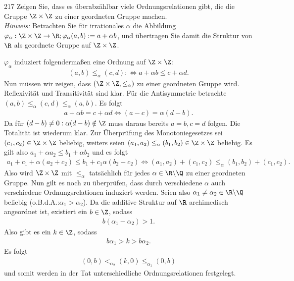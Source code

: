 \begin{algebraUE}{217}
Zeigen Sie, dass es überabzählbar viele Ordnungsrelationen gibt, die die Gruppe
$\Z \times \Z$ zu einer geordneten Gruppe machen. \\
\textit{Hinweis:} Betrachten Sie für irrationales $\alpha$ die Abbildung
$\varphi_{\alpha}: \Z \times \Z \to \R; \varphi_{\alpha}(a,b) := a + \alpha b$,
und übertragen Sie damit die Struktur von $\R$ als geordnete Gruppe auf $\Z \times \Z$.
\end{algebraUE}
\begin{solution}
$\varphi_{\alpha}$ induziert folgendermaßen eine Ordnung auf $\Z \times \Z$:
\begin{align*}
  (a,b) \leq_{\alpha} (c,d) :\iff a + \alpha b \leq c + \alpha d.
\end{align*}
Nun müssen wir zeigen, dass $(\Z \times \Z, \leq_{\alpha})$ zu einer geordneten Gruppe wird.
Reflexivität und Transitivität sind klar.
Für die Antisymmetrie betrachte $(a,b) \leq_{\alpha} (c,d) \leq_{\alpha} (a,b)$. Es folgt
\begin{align*}
  a + \alpha b= c + \alpha d \iff (a-c) = \alpha (d-b).
\end{align*}
Da für $(d-b)\neq 0: \alpha (d-b) \notin \Z$ muss daraus bereits $a=b, c=d$ folgen.
Die Totalität ist wiederum klar.
Zur Überprüfung des Monotoniegesetzes sei $(c_1,c_2) \in \Z \times \Z$ beliebig,
weiters seien $(a_1,a_2) \leq_{\alpha} (b_1,b_2) \in \Z \times \Z$ beliebig.
Es gilt also $a_1 + \alpha a_2 \leq b_1 + \alpha b_2$ und es folgt
\begin{align*}
  a_1 + c_1 + \alpha (a_2 + c_2) \leq b_1 + c_1 \alpha (b_2 + c_2) \iff
  (a_1,a_2) + (c_1,c_2) \leq_{\alpha} (b_1,b_2) + (c_1,c_2).
\end{align*}
Also wird $\Z \times \Z$ mit $\leq_{\alpha}$ tatsächlich für jedes $\alpha \in \R\backslash\Q$
zu einer geordneten Gruppe. Nun gilt es noch zu überprüfen, dass durch
verschiedene $\alpha$ auch verschiedene Ordnungsrelationen induziert werden.
Seien also $\alpha_1 \neq \alpha_2 \in \R\backslash\Q$ beliebig
(o.B.d.A.:$\alpha_1 > \alpha_2$).
Da die additive Struktur auf $\R$ archimedisch angeordnet ist, existiert ein $b \in \Z$, sodass
\begin{align*}
  b(\alpha_1 - \alpha_2) > 1.
\end{align*}
Also gibt es ein $k \in \Z$, sodass
\begin{align*}
  b\alpha_1 > k > b\alpha_2.
\end{align*}
Es folgt
\begin{align*}
  (0,b) <_{\alpha_2} (k,0) \leq_{\alpha_1} (0,b)
\end{align*}
und somit werden in der Tat unterschiedliche Ordnungsrelationen festgelegt.
\end{solution}
